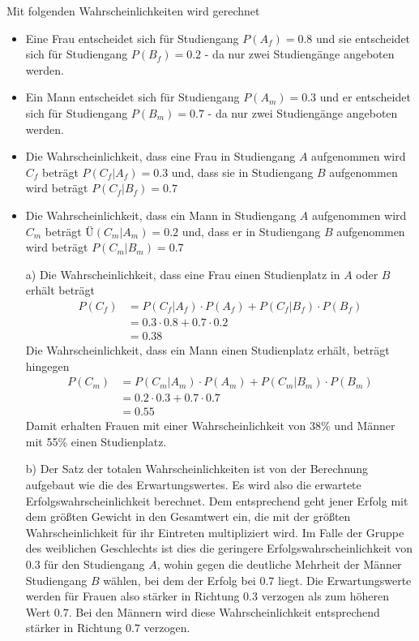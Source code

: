 Mit folgenden Wahrscheinlichkeiten wird gerechnet
\begin{itemize}
	\item Eine Frau entscheidet sich für Studiengang $P(A_f) = 0.8$ und sie entscheidet sich für Studiengang $P(B_f) = 0.2$ - da nur zwei Studiengänge angeboten werden.
	\item Ein Mann entscheidet sich für Studiengang $P(A_m) = 0.3$ und er entscheidet sich für Studiengang $P(B_m) = 0.7$ - da nur zwei Studiengänge angeboten werden.
	\item Die Wahrscheinlichkeit, dass eine Frau in Studiengang $A$ aufgenommen wird $C_f$ beträgt $P(C_f|A_f) = 0.3$ und, dass sie in Studiengang $B$ aufgenommen wird beträgt $P(C_f|B_f) = 0.7$
	\item Die Wahrscheinlichkeit, dass ein Mann in Studiengang $A$ aufgenommen wird $C_m$ beträgt $Ü(C_m|A_m) = 0.2$ und, dass er in Studiengang $B$ aufgenommen wird beträgt $P(C_m|B_m) = 0.7$ 
\end{itemize}
\begin{enumerate}
	\item[a)]
		Die Wahrscheinlichkeit, dass eine Frau einen Studienplatz in $A$ oder $B$ erhält beträgt
		\begin{equation*}
			\begin{split}
				P(C_f) 	&= P(C_f|A_f) \cdot P(A_f) + P(C_f|B_f) \cdot P(B_f)\\
						&= 0.3 \cdot 0.8 + 0.7 \cdot 0.2\\
						&= 0.38
			\end{split}
		\end{equation*}
		Die Wahrscheinlichkeit, dass ein Mann einen Studienplatz erhält, beträgt hingegen
		\begin{equation*}
			\begin{split}
				P(C_m)	&= P(C_m|A_m) \cdot P(A_m) + P(C_m|B_m) \cdot P(B_m)\\
						&= 0.2 \cdot 0.3 + 0.7 \cdot 0.7\\
						&= 0.55
			\end{split}
		\end{equation*}
		Damit erhalten Frauen mit einer Wahrscheinlichkeit von 38\% und Männer mit 55\% einen Studienplatz.
	\item[b)] Der Satz der totalen Wahrscheinlichkeiten ist von der Berechnung aufgebaut wie die des Erwartungswertes. Es wird also die erwartete Erfolgswahrscheinlichkeit berechnet. Dem entsprechend geht jener Erfolg mit dem größten Gewicht in den Gesamtwert ein, die mit der größten Wahrscheinlichkeit für ihr Eintreten multipliziert wird.
	Im Falle der Gruppe des weiblichen Geschlechts ist dies die geringere Erfolgswahrscheinlichkeit von $0.3$ für den Studiengang $A$, wohin gegen die deutliche Mehrheit der Männer Studiengang $B$ wählen, bei dem der Erfolg bei $0.7$ liegt. Die Erwartungswerte werden für Frauen also stärker in Richtung $0.3$ verzogen als zum höheren Wert $0.7$. Bei den Männern wird diese Wahrscheinlichkeit entsprechend stärker in Richtung $0.7$ verzogen. 
\end{enumerate}